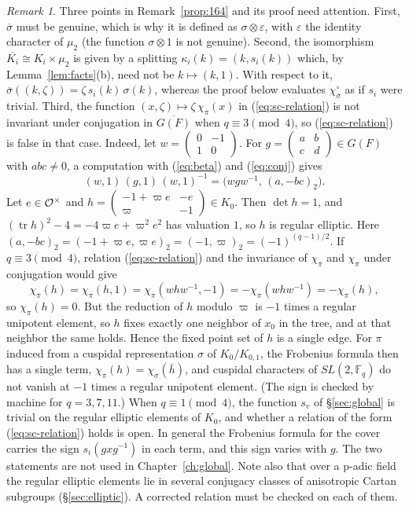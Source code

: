 \documentclass[12pt,letterpaper,openany]{book}
\theoremstyle{plain}
\theoremstyle{definition}
\theoremstyle{remark}
\newtheorem{remark}[theorem]{Remark}
\theoremstyle{remark}
\newcommand{\tr}{\operatorname{tr}}
\begin{document}
\begin{remark}\label{rem:sc-caveat}
Three points in Remark~\ref{prop:164} and its proof need attention.
First, $\overline{\sigma}$ must be genuine, which is why it is defined as
$\sigma\otimes\varepsilon$, with $\varepsilon$ the identity character of
$\mu_2$ (the function $\sigma\otimes1$ is not genuine). Second, the isomorphism
$\overline{K_i}\cong K_i\times\mu_2$ is given by a splitting
$\kappa_i(k)=(k,s_i(k))$ which, by Lemma~\ref{lem:facts}(b), need not be
$k\mapsto(k,1)$. With respect to it,
$\overline{\sigma}((k,\zeta))=\zeta\, s_i(k)\,\sigma(k)$, whereas the proof
below evaluates $\chi_{\overline{\sigma}}^\circ$ as if $s_i$ were
trivial. Third, the function $(x,\zeta)\mapsto\zeta\,\chi_\pi(x)$ in
(\ref{eq:sc-relation}) is not invariant under conjugation in
$\overline{G(F)}$ when $q\equiv3\pmod4$, so (\ref{eq:sc-relation}) is
false in that case. Indeed, let
$w=\left(\begin{smallmatrix}0&-1\\1&0\end{smallmatrix}\right)$. For
$g=\left(\begin{smallmatrix}a&b\\c&d\end{smallmatrix}\right)\in G(F)$ with
$abc\neq0$, a computation with (\ref{eq:beta}) and (\ref{eq:conj}) gives
\[
(w,1)\,(g,1)\,(w,1)^{-1}=\bigl(wgw^{-1},\,(a,-bc)_2\bigr).
\]
Let $e\in{\cal O}^\times$ and
$h=\left(\begin{smallmatrix}-1+\varpi e&-e\\ \varpi&-1\end{smallmatrix}\right)\in K_0$.
Then $\det h=1$, and $(\tr h)^2-4=-4\varpi e+\varpi^2e^2$ has valuation $1$,
so $h$ is regular elliptic. Here
$(a,-bc)_2=(-1+\varpi e,\varpi e)_2=(-1,\varpi)_2=(-1)^{(q-1)/2}$. If
$q\equiv3\pmod4$, relation (\ref{eq:sc-relation}) and the invariance of
$\chi_{\overline\pi}$ and $\chi_\pi$ under conjugation would give
\[
\chi_\pi(h)=\chi_{\overline\pi}(h,1)=\chi_{\overline\pi}(whw^{-1},-1)
=-\chi_\pi(whw^{-1})=-\chi_\pi(h),
\]
so $\chi_\pi(h)=0$. But the reduction of $h$ modulo $\varpi$ is $-1$ times a
regular unipotent element, so $h$ fixes exactly one neighbor of $x_0$ in
the tree, and at that neighbor the same holds. Hence the fixed point set
of $h$ is a single edge. For $\pi$ induced from a cuspidal representation
$\sigma$ of $K_0/K_{0,1}$, the Frobenius formula then has a single term,
$\chi_\pi(h)=\chi_\sigma(\bar h)$, and cuspidal characters of
$SL(2,{\mathbb F}_q)$ do not vanish at $-1$ times a regular unipotent
element. (The sign is checked by machine for $q=3,7,11$.) When
$q\equiv1\pmod4$, the function $s_v$ of \S\ref{sec:global} is trivial on
the regular elliptic elements of $K_0$, and whether a relation of the form
(\ref{eq:sc-relation}) holds is open. In general the Frobenius formula for
the cover carries the sign $s_i(gxg^{-1})$ in each term, and this sign
varies with $g$. The two statements are not used
in Chapter~\ref{ch:global}. Note also that over a p-adic field the
regular elliptic elements lie in several conjugacy classes of anisotropic
Cartan subgroups (\S\ref{sec:elliptic}). A corrected relation must be
checked on each of them.
\end{remark}
\end{document}
